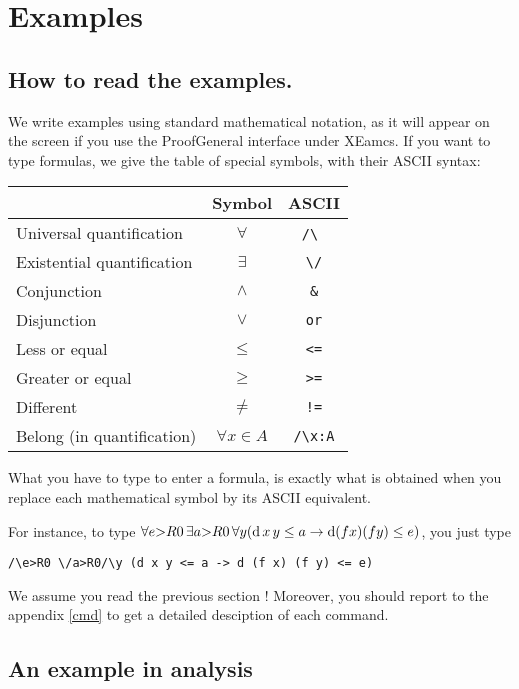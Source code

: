 
\chapter{Examples}

\section{How to read the examples.}

We write examples using standard mathematical notation, as it will
appear on the screen if you use the ProofGeneral interface under
XEamcs. If you want to type formulas, we give the table of special
symbols, with their ASCII syntax:

\begin{center}
\begin{tabular}{|l|c|c|}
\hline
& Symbol & ASCII \\
\hline
Universal quantification & $\forall$ & \verb~/\~ \\
Existential quantification & $\exists$ & \verb~\/~ \\
Conjunction & $\land$ & \verb~&~ \\
Disjunction & $\lor$ & \verb~or~ \\
Less or equal & $\leq$ & \verb~<=~ \\
Greater or equal & $\geq$ & \verb~>=~ \\
Different & $\neq$ & \verb~!=~ \\
Belong (in quantification) & $\forall x\in A$ & \verb~/\x:A~ \\
\hline
\end{tabular}
\end{center}

What you have to type to enter a formula, is exactly what is obtained
when you replace each mathematical symbol by its ASCII equivalent.

For instance, to type $\forall e{>}R0 \,\exists a{>}R0
\,\forall y
(\hbox{d}\,x\,y \leq a \rightarrow \hbox{d} (f x) (f y) \leq e)$,
you just type

\verb~/\e>R0 \/a>R0/\y (d x y <= a -> d (f x) (f y) <= e)~

We assume you read the previous section ! Moreover, you should report to
the appendix \ref{cmd} to get a detailed desciption of each command.


\section{An example in analysis}

